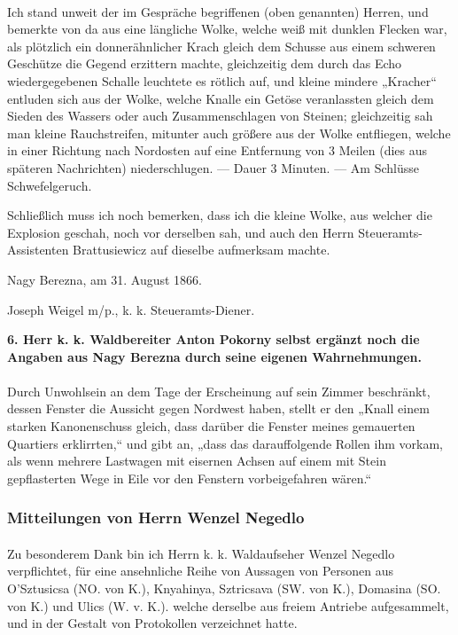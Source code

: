 \documentclass[a4paper, 11pt, oneside, german]{article}
\begin{document}
\paragraph{}
Ich stand unweit der im Gespräche begriffenen (oben genannten) Herren, und bemerkte von da aus eine längliche Wolke, welche weiß mit dunklen Flecken war, als plötzlich ein donnerähnlicher Krach gleich dem Schusse aus einem schweren Geschütze die Gegend erzittern machte, gleichzeitig dem durch das Echo wiedergegebenen Schalle leuchtete es rötlich auf, und kleine mindere „Kracher“ entluden sich aus der Wolke, welche Knalle ein Getöse veranlassten gleich dem Sieden des Wassers oder auch Zusammenschlagen von Steinen; gleichzeitig sah man kleine Rauchstreifen, mitunter auch größere aus der Wolke entfliegen, welche in einer Richtung nach Nordosten auf eine Entfernung von 3 Meilen (dies aus späteren Nachrichten) niederschlugen. --- Dauer 3 Minuten. --- Am Schlüsse Schwefelgeruch.

Schließlich muss ich noch bemerken, dass ich die kleine Wolke, aus welcher die Explosion geschah, noch vor derselben sah, und auch den Herrn Steueramts-Assistenten Brattusiewicz auf dieselbe aufmerksam machte.

\hspace*{10mm}Nagy Berezna, am 31. August 1866.

\hspace*{15mm}Joseph Weigel m/p., k. k. Steueramts-Diener.
\begin{center}
\textbf{6. Herr k. k. Waldbereiter Anton Pokorny selbst ergänzt noch die Angaben aus Nagy Berezna durch seine eigenen Wahrnehmungen.}
\end{center}
\paragraph{}
Durch Unwohlsein an dem Tage der Erscheinung auf sein Zimmer beschränkt, dessen Fenster die Aussicht gegen Nordwest haben, stellt er den „Knall einem starken Kanonenschuss gleich, dass darüber die Fenster meines gemauerten Quartiers erklirrten,“ und gibt an, „dass das darauffolgende Rollen ihm vorkam, als wenn mehrere Lastwagen mit eisernen Achsen auf einem mit Stein gepflasterten Wege in Eile vor den Fenstern vorbeigefahren wären.“
\clearpage
\subsubsection{Mitteilungen von Herrn Wenzel Negedlo}
\paragraph{}
Zu besonderem Dank bin ich Herrn k. k. Waldaufseher Wenzel Negedlo verpflichtet, für eine ansehnliche Reihe von Aussagen von Personen aus O'Sztusicsa (NO. von K.), Knyahinya, Sztricsava (SW. von K.), Domasina (SO. von K.) und Ulics (W. v. K.). welche derselbe aus freiem Antriebe aufgesammelt, und in der Gestalt von Protokollen verzeichnet hatte.
\end{document}
